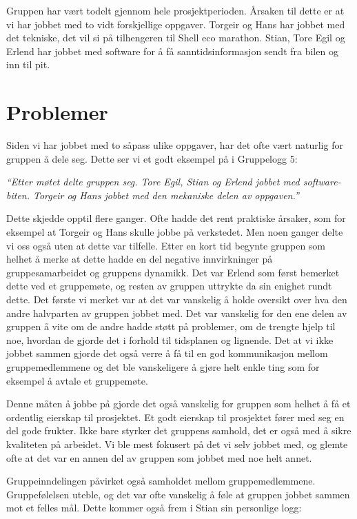 Gruppen har vært todelt gjennom hele prosjektperioden. Årsaken til dette er at vi har jobbet med to vidt forskjellige oppgaver. Torgeir og Hans har jobbet med det tekniske, det vil si på tilhengeren til Shell eco marathon. Stian, Tore Egil og Erlend har jobbet med software for å få sanntidsinformasjon sendt fra bilen og inn til pit.

\section{Problemer}
Siden vi har jobbet med to såpass ulike oppgaver, har det ofte vært naturlig for gruppen å dele seg. Dette ser vi et godt eksempel på i Gruppelogg 5: \newline

\emph{``Etter møtet delte gruppen seg. Tore Egil, Stian og Erlend jobbet med software-biten. Torgeir
og Hans jobbet med den mekaniske delen av oppgaven.''}\newline

Dette skjedde opptil flere ganger. Ofte hadde det rent praktiske årsaker, som for eksempel at Torgeir og Hans skulle jobbe på verkstedet. Men noen ganger delte vi oss også uten at dette var tilfelle. Etter en kort tid begynte gruppen som helhet å merke at dette hadde en del negative innvirkninger på gruppesamarbeidet og gruppens dynamikk. Det var Erlend som først bemerket dette ved et gruppemøte, og resten av gruppen uttrykte da sin enighet rundt dette.
Det første vi merket var at det var vanskelig å holde oversikt over hva den andre halvparten av gruppen jobbet med. Det var vanskelig for den ene delen av gruppen å vite om de andre hadde støtt på problemer, om de trengte hjelp til noe, hvordan de gjorde det i forhold til tidsplanen og lignende. Det at vi ikke jobbet sammen gjorde det også verre å få til en god kommunikasjon mellom gruppemedlemmene og det ble vanskeligere å gjøre helt enkle ting som for eksempel å avtale et gruppemøte. \newline

Denne måten å jobbe på gjorde det også vanskelig for gruppen som helhet å få et ordentlig eierskap til prosjektet. Et godt eierskap til prosjektet fører med seg en del gode frukter. Ikke bare styrker det gruppens samhold, det er også med å sikre kvaliteten på arbeidet. Vi ble mest fokusert på det vi selv jobbet med, og glemte ofte at det var en annen del av gruppen som jobbet med noe helt annet. 

Gruppeinndelingen påvirket også samholdet mellom gruppemedlemmene. Gruppefølelsen uteble, og det var ofte vanskelig å føle at gruppen jobbet sammen mot et felles mål. Dette kommer også frem i Stian sin personlige logg:\newline

